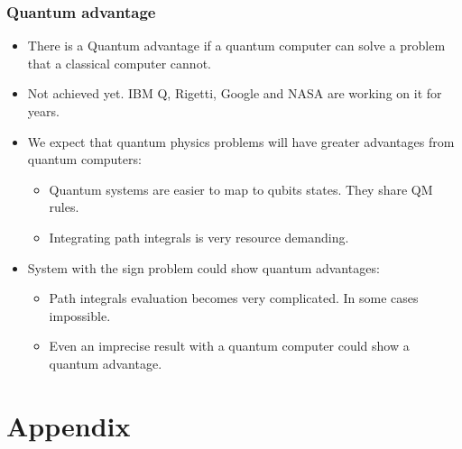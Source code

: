 \documentclass[11pt,t,xcolor=dvipsnames,aspectratio=169]{beamer}
\newlength\leftsidebar
\begin{document}
\begin{frame}
    \frametitle{Quantum advantage}
    \begin{itemize}
        \item
            There is a Quantum advantage if a quantum computer can solve a problem that a classical computer cannot.
        \item
            Not achieved yet. IBM Q, Rigetti, Google and NASA are working on it for years.
        \item
            We expect that quantum physics problems will have greater advantages from quantum computers:
            \begin{itemize}
                \item Quantum systems are easier to map to qubits states. They share QM rules.
                \item Integrating path integrals is very resource demanding.
            \end{itemize}
        \item
            System with the sign problem could show quantum advantages:
            \begin{itemize}
                \item Path integrals evaluation becomes very complicated. In some cases impossible.
                \item Even an imprecise result with a quantum computer could show a quantum advantage.
            \end{itemize}
    \end{itemize}
\end{frame}

\leftsidebar
\begin{frame}[plain,t]
\titlepage
\end{frame}
\hoffset=0in %

\section{Appendix}
\end{document}
